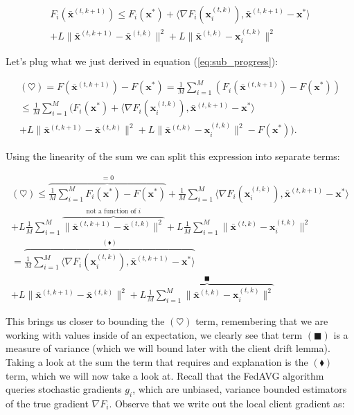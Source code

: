 \begin{align*}
    F_i(\bar{\bm{x}}^{(t,k+1)}) \leq F_i(\bm{x}^{*}) +  \langle \nabla F_i(\bm{x}_i^{(t,k)}) ,\bar{\bm{x}}^{(t,k+1)} - \bm{x}^{*} \rangle \\+ L \|\bar{\bm{x}}^{(t,k+1)}-\bar{\bm{x}}^{(t,k)} \|^2  + L \|\bar{\bm{x}}^{(t,k)}-\bm{x}_i^{(t,k)} \|^2 
\end{align*}

Let's plug what we just derived in equation (\ref{eq:sub_progress}):


\begin{align*}
    (\heartsuit) = F(\bar{\bm{x}}^{(t,k+1)}) - F(\bm{x}^*) = \frac{1}{M} \sum_{i=1}^M \left( F_i(\bar{\bm{x}}^{(t,k+1)})  - F(\bm{x}^*)\right) \\
    \leq  \frac{1}{M} \sum_{i=1}^M \Big( F_i(\bm{x}^{*}) +  \langle \nabla F_i(\bm{x}_i^{(t,k)}) ,\bar{\bm{x}}^{(t,k+1)} - \bm{x}^{*} \rangle \\+ L \|\bar{\bm{x}}^{(t,k+1)}-\bar{\bm{x}}^{(t,k)} \|^2  + L \|\bar{\bm{x}}^{(t,k)}-\bm{x}_i^{(t,k)} \|^2  - F(\bm{x}^*)\Big).
\end{align*}

Using the linearity of the sum we can split this expression into separate terms:

\begin{align*}
    (\heartsuit) \leq \overbrace{\frac{1}{M} \sum_{i=1}^M F_i(\bm{x}^{*}) - F(\bm{x}^*)}^{=0} + \frac{1}{M} \sum_{i=1}^M  \langle \nabla F_i(\bm{x}_i^{(t,k)}) ,\bar{\bm{x}}^{(t,k+1)} - \bm{x}^{*} \rangle \\+ L \frac{1}{M} \sum_{i=1}^M \overbrace{ \|\bar{\bm{x}}^{(t,k+1)}-\bar{\bm{x}}^{(t,k)} \|^2}^\text{not a function of $i$}  + L \frac{1}{M} \sum_{i=1}^M \|\bar{\bm{x}}^{(t,k)}-\bm{x}_i^{(t,k)} \|^2 \\
    = \overbrace{\frac{1}{M} \sum_{i=1}^M  \langle \nabla F_i(\bm{x}_i^{(t,k)}) ,\bar{\bm{x}}^{(t,k+1)} - \bm{x}^{*} \rangle}^{(\blacklozenge)} \\+ L  \|\bar{\bm{x}}^{(t,k+1)}-\bar{\bm{x}}^{(t,k)} \|^2  +\overbrace{ L \frac{1}{M} \sum_{i=1}^M \|\bar{\bm{x}}^{(t,k)}-\bm{x}_i^{(t,k)} \|^2 }^{{\blacksquare}}
\end{align*}

This brings us closer to bounding the $(\heartsuit)$ term, remembering that we are working with values inside of an expectation, we clearly see that term $(\blacksquare)$ is a measure of variance (which we will bound later with the client drift lemma). Taking a look at the sum the term that requires and explanation is the $(\blacklozenge)$ term, which we will now take a look at. Recall that the FedAVG algorithm queries stochastic gradients $g_i$, which are unbiased, variance bounded estimators of the true gradient $\nabla F_i$. Observe that we write out the local client gradient as:

